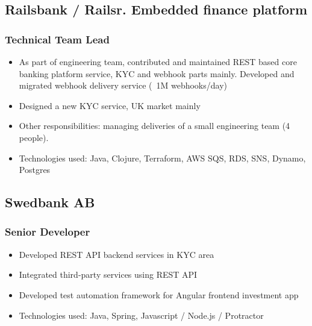 \documentclass[11pt]{article}
\begin{document}
\subsection{Railsbank / Railsr. Embedded finance platform}
\subsubsection{Technical Team Lead }
\begin{itemize}

\item As part of engineering team, contributed and maintained REST based core banking platform service, KYC and webhook parts mainly. Developed and migrated webhook delivery service (~1M webhooks/day)
\item Designed a new KYC service, UK market mainly
\item Other responsibilities: managing deliveries of a small engineering team (4 people).
\item Technologies used: Java, Clojure, Terraform, AWS SQS, RDS, SNS, Dynamo, Postgres
\end{itemize}


\subsection{Swedbank AB}
\subsubsection{Senior Developer }
\begin{itemize}
\item Developed REST API backend services in KYC area
\item Integrated third-party services using REST API
\item Developed test automation framework for Angular frontend investment app
\item Technologies used: Java, Spring, Javascript / Node.js / Protractor
\end{itemize}
\end{document}
